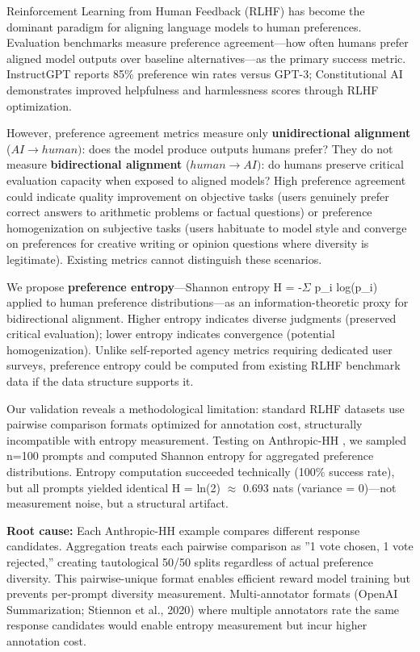 
Reinforcement Learning from Human Feedback (RLHF) has become the dominant paradigm for aligning language models to human preferences. Evaluation benchmarks measure preference agreement---how often humans prefer aligned model outputs over baseline alternatives---as the primary success metric. InstructGPT \citep{ouyang2022instructgpt} reports 85\% preference win rates versus GPT-3; Constitutional AI \citep{bai2022constitutional} demonstrates improved helpfulness and harmlessness scores through RLHF optimization.

However, preference agreement metrics measure only \textbf{unidirectional alignment} ($AI\rightarrow human)$: does the model produce outputs humans prefer? They do not measure \textbf{bidirectional alignment} ($human\rightarrow AI)$: do humans preserve critical evaluation capacity when exposed to aligned models? High preference agreement could indicate quality improvement on objective tasks (users genuinely prefer correct answers to arithmetic problems or factual questions) or preference homogenization on subjective tasks (users habituate to model style and converge on preferences for creative writing or opinion questions where diversity is legitimate). Existing metrics cannot distinguish these scenarios.

We propose \textbf{preference entropy}---Shannon entropy H = -$\Sigma$ p\_i log(p\_i) applied to human preference distributions---as an information-theoretic proxy for bidirectional alignment. Higher entropy indicates diverse judgments (preserved critical evaluation); lower entropy indicates convergence (potential homogenization). Unlike self-reported agency metrics requiring dedicated user surveys, preference entropy could be computed from existing RLHF benchmark data if the data structure supports it.

Our validation reveals a methodological limitation: standard RLHF datasets use pairwise comparison formats optimized for annotation cost, structurally incompatible with entropy measurement. Testing on Anthropic-HH \citep{bai2022constitutional}, we sampled n=100 prompts and computed Shannon entropy for aggregated preference distributions. Entropy computation succeeded technically (100\% success rate), but all prompts yielded identical H = ln(2) $\approx$ 0.693 nats (variance = 0)---not measurement noise, but a structural artifact.

\textbf{Root cause:} Each Anthropic-HH example compares different response candidates. Aggregation treats each pairwise comparison as ''1 vote chosen, 1 vote rejected,'' creating tautological 50/50 splits regardless of actual preference diversity. This pairwise-unique format enables efficient reward model training but prevents per-prompt diversity measurement. Multi-annotator formats (OpenAI Summarization; Stiennon et al., 2020) where multiple annotators rate the same response candidates would enable entropy measurement but incur higher annotation cost.

